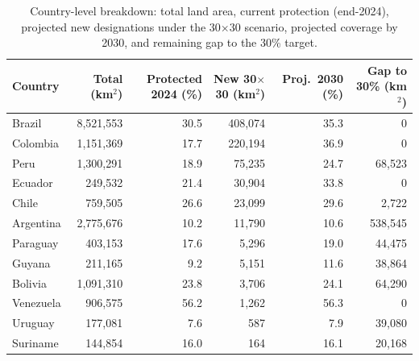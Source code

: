 \begin{table}[htbp]
  \centering
  \small
  \caption{Country-level breakdown: total land area, current protection (end-2024), projected new designations under the 30$\times$30 scenario, projected coverage by 2030, and remaining gap to the 30\% target.}
  \label{tab:forward_country}
  \begin{tabular}{lrrrrr}
    \toprule
    Country & Total (km$^2$) & Protected 2024 (\%) & New 30$\times$30 (km$^2$) & Proj.\ 2030 (\%) & Gap to 30\% (km$^2$) \\
    \midrule
    Brazil & 8,521,553 & 30.5 & 408,074 & 35.3 & 0 \\
    Colombia & 1,151,369 & 17.7 & 220,194 & 36.9 & 0 \\
    Peru & 1,300,291 & 18.9 & 75,235 & 24.7 & 68,523 \\
    Ecuador & 249,532 & 21.4 & 30,904 & 33.8 & 0 \\
    Chile & 759,505 & 26.6 & 23,099 & 29.6 & 2,722 \\
    Argentina & 2,775,676 & 10.2 & 11,790 & 10.6 & 538,545 \\
    Paraguay & 403,153 & 17.6 & 5,296 & 19.0 & 44,475 \\
    Guyana & 211,165 & 9.2 & 5,151 & 11.6 & 38,864 \\
    Bolivia & 1,091,310 & 23.8 & 3,706 & 24.1 & 64,290 \\
    Venezuela & 906,575 & 56.2 & 1,262 & 56.3 & 0 \\
    Uruguay & 177,081 & 7.6 & 587 & 7.9 & 39,080 \\
    Suriname & 144,854 & 16.0 & 164 & 16.1 & 20,168 \\
    \bottomrule
  \end{tabular}
\end{table}

